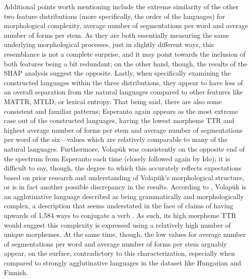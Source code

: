 \documentclass[12pt,a4paper]{article}
\numberwithin{figure}{section}
\numberwithin{table}{section}
\numberwithin{definition}{section}
\begin{document}
Additional points worth mentioning include the extreme similarity of the other two feature distributions (more specifically, the order of the languages) for morphological complexity, average number of segmentations per word and average number of forms per stem. As they are both essentially measuring the same underlying morphological processes, just in slightly different ways, this resemblance is not a complete surprise, and it may point towards the inclusion of both features being a bit redundant; on the other hand, though, the results of the SHAP analysis suggest the opposite. Lastly, when specifically examining the constructed languages within the three distributions, they appear to have less of an overall separation from the natural languages compared to other features like MATTR, MTLD, or lexical entropy. That being said, there are also some consistent and familiar patterns; Esperanto again appears as the most extreme case out of the constructed languages, having the lowest morpheme TTR and highest average number of forms per stem and average number of segmentations per word of the six---values which are relatively comparable to many of the natural languages. Furthermore, Volapük was consistently on the opposite end of the spectrum from Esperanto each time (closely followed again by Ido); it is difficult to say, though, the degree to which this accurately reflects expectations based on prior research and understanding of Volapük's morphological structure, or is in fact another possible discrepancy in the results. According to \textcite{Reagan2019book}, Volapük is an agglutinative language described as being grammatically and morphologically complex, a description that seems understated in the face of claims of having upwards of 1,584 ways to conjugate a verb \parencite{Reagan2019book,Rogers2011book}. As such, its high morpheme TTR would suggest this complexity is expressed using a relatively high number of unique morphemes. At the same time, though, the low values for average number of segmentations per word and average number of forms per stem arguably appear, on the surface, contradictory to this characterization, especially when compared to strongly agglutinative languages in the dataset like Hungarian and Finnish. %

\end{document}
